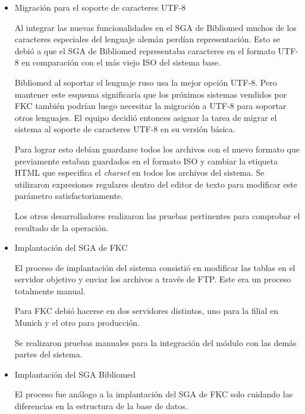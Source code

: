 \begin{itemize}

\item Migración para el soporte de caracteres UTF-8

Al integrar las nuevas funcionalidades en el SGA de Bibliomed muchos de los caracteres especiales del lenguaje alemán perdían representación. Esto se debió a que el SGA de Bibliomed representaba caracteres en el formato UTF-8 en comparación con el más viejo ISO del sistema base.

Bibliomed al soportar el lenguaje ruso usa la mejor opción UTF-8. Pero mantener este esquema significaría que los próximos sistemas vendidos por FKC también podrían luego necesitar la migración a UTF-8 para soportar otros lenguajes. El equipo decidió entonces asignar la tarea de migrar el sistema al soporte de caracteres UTF-8 en su versión básica.

Para lograr esto debían guardarse todos los archivos con el nuevo formato que previamente estaban guardados en el formato ISO y cambiar la etiqueta \gls{HTML} que especifica el \emph{charset} en todos los archivos del sistema. Se utilizaron expresiones regulares dentro del editor de texto para modificar este parámetro satisfactoriamente.

Los otros desarrolladores realizaron las pruebas pertinentes para comprobar el resultado de la operación.

\item Implantación del SGA de FKC

El proceso de implantación del sistema consistió en modificar las tablas en el servidor objetivo y enviar los archivos a través de \gls{FTP}. Este era un proceso totalmente manual.

Para FKC debió hacerse en dos servidores distintos, uno para la filial en Munich y el otro para producción.

Se realizaron pruebas manuales para la integración del módulo con las demás partes del sistema.

\item Implantación del SGA Bibliomed

El proceso fue análogo a la implantación del SGA de FKC solo cuidando las diferencias en la estructura de la base de datos.

\end{itemize}


